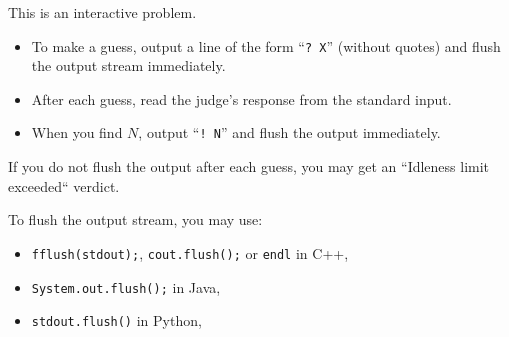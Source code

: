This is an interactive problem.  
\begin{itemize}
  \item To make a guess, output a line of the form ``\texttt{? X}'' (without quotes) and flush the output stream immediately.
  \item After each guess, read the judge's response from the standard input.
  \item When you find $N$, output ``\texttt{! N}'' and flush the output immediately.
\end{itemize}

If you do not flush the output after each guess, you may get an ``Idleness limit exceeded`` verdict.

To flush the output stream, you may use:
\begin{itemize}
  \item \texttt{fflush(stdout);}, \texttt{cout.flush();} or \texttt{endl} in C++,
  \item \texttt{System.out.flush();} in Java,
  \item \texttt{stdout.flush()} in Python,
\end{itemize}

